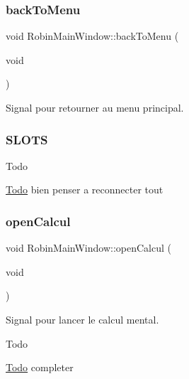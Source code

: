 \subsubsection{\texorpdfstring{back\+To\+Menu}{backToMenu}}
{\footnotesize\ttfamily void Robin\+Main\+Window\+::back\+To\+Menu (\begin{DoxyParamCaption}\item[{void}]{ }\end{DoxyParamCaption})\hspace{0.3cm}{\ttfamily [slot]}}



Signal pour retourner au menu principal. 



 \subsubsection*{S\+L\+O\+TS }

\begin{DoxyRefDesc}{Todo}
\item[\hyperlink{todo__todo000026}{Todo}]bien penser a reconnecter tout \end{DoxyRefDesc}
\mbox{\label{class_robin_main_window_a55e49d0a4d727066b553fc2277dd8a78}} 
\subsubsection{\texorpdfstring{open\+Calcul}{openCalcul}}
{\footnotesize\ttfamily void Robin\+Main\+Window\+::open\+Calcul (\begin{DoxyParamCaption}\item[{void}]{ }\end{DoxyParamCaption})\hspace{0.3cm}{\ttfamily [slot]}}



Signal pour lancer le calcul mental. 

\begin{DoxyRefDesc}{Todo}
\item[\hyperlink{todo__todo000023}{Todo}]completer \end{DoxyRefDesc}
\mbox{\label{class_robin_main_window_aaf62641d678eb0f8829a2fb9c513ae68}} 
